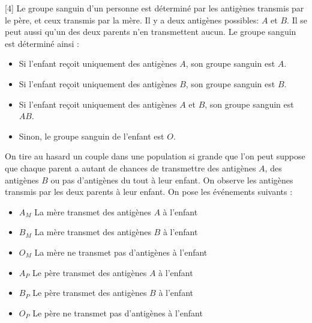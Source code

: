 \documentclass{exam}
\begin{document}
\begin{questions}

\vspace*{1cm}
[4]
Le groupe sanguin d'un personne est déterminé par les antigènes transmis par le père, et ceux transmis par la mère. Il y a deux antigènes possibles: $A$ et $B$. Il se peut aussi qu'un des deux parents n'en transmettent aucun. Le groupe sanguin est déterminé ainsi :
\begin{itemize}
\item Si l'enfant reçoit uniquement des antigènes $A$, son groupe sanguin est $A$.
\item Si l'enfant reçoit uniquement des antigènes $B$, son groupe sanguin est $B$.
\item Si l'enfant reçoit uniquement des antigènes $A$ et $B$, son groupe sanguin est $AB$.
\item Sinon, le groupe sanguin de l'enfant est $O$.
\end{itemize}
On tire au hasard un couple dans une population si grande que l'on peut suppose que chaque parent a autant de chances de transmettre des antigènes $A$, des antigènes $B$ ou pas d'antigènes du tout à leur enfant. On observe les antigènes transmis par les deux parents à leur enfant. On pose les événements suivants :
\begin{itemize}
\item $A_M$ \og La mère transmet des antigènes $A$ à l'enfant \fg 
\item $B_M$ \og La mère transmet des antigènes $B$ à l'enfant \fg 
\item $O_M$ \og La mère ne transmet pas d'antigènes à l'enfant \fg 
\item $A_P$ \og Le père transmet des antigènes $A$ à l'enfant \fg 
\item $B_P$ \og Le père transmet des antigènes $B$ à l'enfant \fg 
\item $O_P$ \og Le père ne transmet pas d'antigènes à l'enfant \fg 
\end{itemize}
\begin{parts}

\end{parts}
\end{questions}
\end{document}
